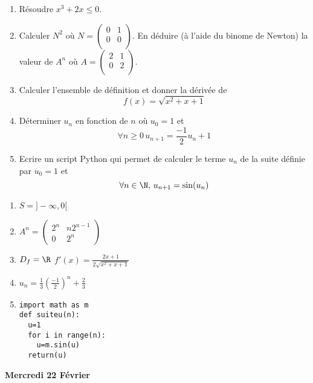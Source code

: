 \documentclass[a4paper, 11pt,reqno]{article}
\begin{document}
\begin{enumerate}
\item Résoudre $x^3+2x\leq 0$.
\item Calculer $N^2$ où $N=\begin{pmatrix}
0&1\\
0&0\\
\end{pmatrix}$. En déduire (à l'aide du binome de Newton) la valeur de $A^n$ où $A=\begin{pmatrix}
2&1\\
0&2\\
\end{pmatrix}$. 
\item Calculer l'ensemble de définition et donner la dérivée de $$f(x) =\sqrt{x^2+x+1}$$
\item Déterminer $u_n$ en fonction de $n$ où $u_0=1$ et 
$$\forall n \geq 0\, u_{n+1} =\frac{-1}{2}u_n+1$$

\item Ecrire un script Python qui permet de calculer le terme $u_n$ de la suite définie par $u_0=1$ et 
$$\forall n \in \N, \, u_{n+1} = \sin(u_n)$$
\end{enumerate}
\begin{correction}
\begin{enumerate}
\item $S=]-\infty, 0[$
\item $A^n =\begin{pmatrix}
2^n & n2^{n-1}\\
0& 2^n
\end{pmatrix}
$
\item $D_f= \R$ $f'(x) =\frac{2x+1}{2\sqrt{x^2+x+1} }$
\item $u_n=\frac{1}{3}\left(\frac{-1}{2}\right)^n  +\frac{2}{3}$
\item 
\begin{lstlisting}
import math as m
def suiteu(n):
  u=1
  for i in range(n):
    u=m.sin(u)
  return(u)
\end{lstlisting}
\end{enumerate}
\end{correction}
 

\begin{center}
\textbf{Mercredi 22 Février }
\end{center}
\end{document}
